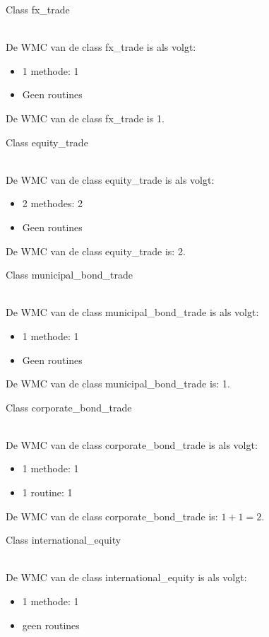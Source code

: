 \documentclass[a4paper,titlepage]{artikel1}
\begin{document}
    \begin{bf}Class fx\_trade\end{bf}\\
    De WMC van de class fx\_trade is als volgt:
    \begin{itemize}
      \item 1 methode: 1
      \item Geen routines
    \end{itemize}
    De WMC van de class fx\_trade is 1.\\
    \begin{bf}Class equity\_trade\end{bf}\\
    De WMC van de class equity\_trade is als volgt:
    \begin{itemize}
      \item 2 methodes: 2
      \item Geen routines
    \end{itemize}
    De WMC van de class equity\_trade is: 2.\\
    \begin{bf}Class municipal\_bond\_trade\end{bf} \\
    De WMC van de class municipal\_bond\_trade is als volgt:
    \begin{itemize}
      \item 1 methode: 1
      \item Geen routines
    \end{itemize}
    De WMC van de class municipal\_bond\_trade is: 1.\\
    \begin{bf}Class corporate\_bond\_trade\end{bf}\\
    De WMC van de class corporate\_bond\_trade is als volgt:
    \begin{itemize}
      \item 1 methode: 1
      \item 1 routine: 1
    \end{itemize}
    De WMC van de class corporate\_bond\_trade is: $1 + 1 = 2$.\\
    \begin{bf}Class international\_equity\end{bf}\\
    De WMC van de class international\_equity is als volgt:
    \begin{itemize}
      \item 1 methode: 1
      \item geen routines
    \end{itemize}
\end{document}
